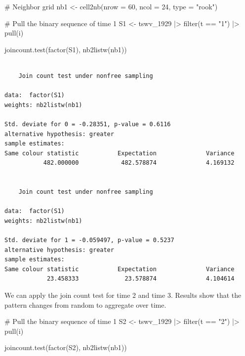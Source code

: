 \documentclass[
  letterpaper,
  DIV=11,
  numbers=noendperiod]{scrreprt}
\newenvironment{Shaded}{\begin{snugshade}}{\end{snugshade}}
\newcommand{\AttributeTok}[1]{\textcolor[rgb]{0.40,0.45,0.13}{#1}}
\newcommand{\CommentTok}[1]{\textcolor[rgb]{0.37,0.37,0.37}{#1}}
\newcommand{\DecValTok}[1]{\textcolor[rgb]{0.68,0.00,0.00}{#1}}
\newcommand{\FunctionTok}[1]{\textcolor[rgb]{0.28,0.35,0.67}{#1}}
\newcommand{\NormalTok}[1]{\textcolor[rgb]{0.00,0.23,0.31}{#1}}
\newcommand{\OtherTok}[1]{\textcolor[rgb]{0.00,0.23,0.31}{#1}}
\newcommand{\SpecialCharTok}[1]{\textcolor[rgb]{0.37,0.37,0.37}{#1}}
\newcommand{\StringTok}[1]{\textcolor[rgb]{0.13,0.47,0.30}{#1}}
\begin{document}
\begin{Shaded}
\begin{Highlighting}[]
\CommentTok{\# Neighbor grid}
\NormalTok{nb1 }\OtherTok{\textless{}{-}} \FunctionTok{cell2nb}\NormalTok{(}\AttributeTok{nrow =} \DecValTok{60}\NormalTok{,}
               \AttributeTok{ncol =} \DecValTok{24}\NormalTok{,}
               \AttributeTok{type =} \StringTok{"rook"}\NormalTok{)}

\CommentTok{\# Pull the binary sequence of time 1}
\NormalTok{S1 }\OtherTok{\textless{}{-}}\NormalTok{ tswv\_1929 }\SpecialCharTok{|\textgreater{}}
  \FunctionTok{filter}\NormalTok{(t }\SpecialCharTok{==} \StringTok{"1"}\NormalTok{) }\SpecialCharTok{|\textgreater{}}
  \FunctionTok{pull}\NormalTok{(i)}

\FunctionTok{joincount.test}\NormalTok{(}\FunctionTok{factor}\NormalTok{(S1),}
               \FunctionTok{nb2listw}\NormalTok{(nb1))}
\end{Highlighting}
\end{Shaded}

\begin{verbatim}

    Join count test under nonfree sampling

data:  factor(S1) 
weights: nb2listw(nb1) 

Std. deviate for 0 = -0.28351, p-value = 0.6116
alternative hypothesis: greater
sample estimates:
Same colour statistic           Expectation              Variance 
           482.000000            482.578874              4.169132 


    Join count test under nonfree sampling

data:  factor(S1) 
weights: nb2listw(nb1) 

Std. deviate for 1 = -0.059497, p-value = 0.5237
alternative hypothesis: greater
sample estimates:
Same colour statistic           Expectation              Variance 
            23.458333             23.578874              4.104614 
\end{verbatim}

We can apply the join count test for time 2 and time 3. Results show
that the pattern changes from random to aggregate over time.

\begin{Shaded}
\begin{Highlighting}[]
\CommentTok{\# Pull the binary sequence of time 1}
\NormalTok{S2 }\OtherTok{\textless{}{-}}\NormalTok{ tswv\_1929 }\SpecialCharTok{|\textgreater{}}
  \FunctionTok{filter}\NormalTok{(t }\SpecialCharTok{==} \StringTok{"2"}\NormalTok{) }\SpecialCharTok{|\textgreater{}}
  \FunctionTok{pull}\NormalTok{(i)}

\FunctionTok{joincount.test}\NormalTok{(}\FunctionTok{factor}\NormalTok{(S2),}
               \FunctionTok{nb2listw}\NormalTok{(nb1))}
\end{Highlighting}
\end{Shaded}
\end{document}
